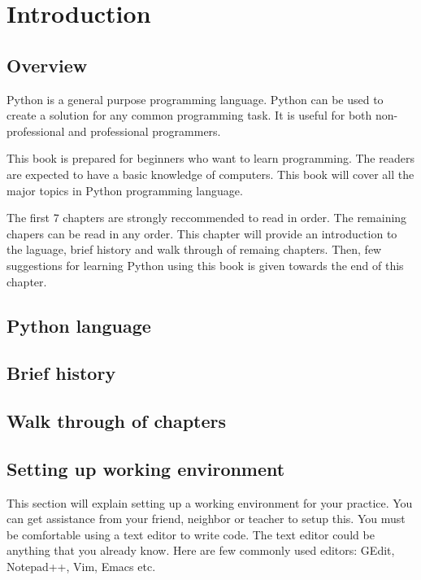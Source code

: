 \cleardoublepage
{}
\chapter{Introduction}

\section{Overview}

Python is a general purpose programming language.  Python can be used
to create a solution for any common programming task.  It is useful
for both non-professional and professional programmers.

This book is prepared for beginners who want to learn programming.
The readers are expected to have a basic knowledge of computers.  This
book will cover all the major topics in Python programming language.

The first 7 chapters are strongly reccommended to read in order.  The
remaining chapers can be read in any order.  This chapter will provide
an introduction to the laguage, brief history and walk through of
remaing chapters.  Then, few suggestions for learning Python using
this book is given towards the end of this chapter.

\section{Python language}

\section{Brief history}

\section{Walk through of chapters}

\section{Setting up working environment}

This section will explain setting up a working environment for your
practice.  You can get assistance from your friend, neighbor or
teacher to setup this.  You must be comfortable using a text editor to
write code.  The text editor could be anything that you already know.
Here are few commonly used editors: GEdit, Notepad++, Vim, Emacs etc.

